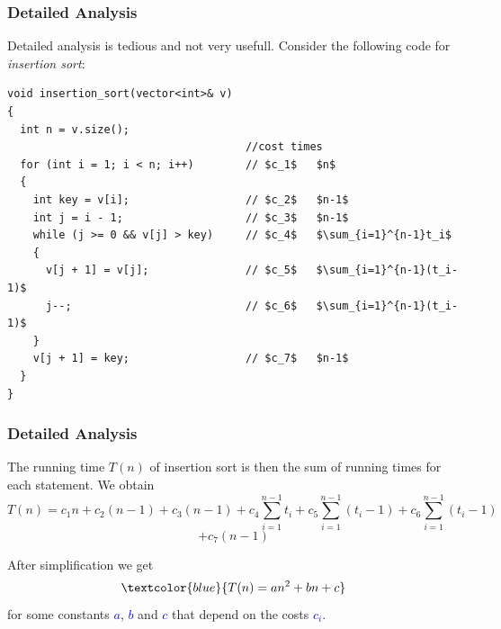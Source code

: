 \documentclass{beamer}
\begin{document}
\begin{frame}[containsverbatim]
\frametitle{Detailed Analysis}

\scriptsize

Detailed analysis is tedious and not very usefull.
Consider the following code for \emph{insertion sort}:

\begin{lstlisting}[mathescape]
void insertion_sort(vector<int>& v)
{
  int n = v.size();
                                     //cost times
  for (int i = 1; i < n; i++)        // $c_1$   $n$
  {
    int key = v[i];                  // $c_2$   $n-1$
    int j = i - 1;                   // $c_3$   $n-1$
    while (j >= 0 && v[j] > key)     // $c_4$   $\sum_{i=1}^{n-1}t_i$
    {
      v[j + 1] = v[j];               // $c_5$   $\sum_{i=1}^{n-1}(t_i-1)$
      j--;                           // $c_6$   $\sum_{i=1}^{n-1}(t_i-1)$
    }
    v[j + 1] = key;                  // $c_7$   $n-1$
  }
}
\end{lstlisting}


\end{frame}

\begin{frame}%
\frametitle{Detailed Analysis}

The running time $T(n)$ of insertion sort is then the sum of running times for
each statement. We obtain
$$
T(n) = c_1n + c_2(n - 1) + c_3(n - 1) + c_4\sum_{i=1}^{n-1}t_i + c_5\sum_{i=1}^{n-1}(t_i - 1) + c_6\sum_{i=1}^{n-1}(t_i - 1)
$$
$$
 + c_7(n - 1)
$$

After simplification we get
$$
\textcolor{blue}{T(n) = an^2 + bn + c}
$$
for some constants \textcolor{blue}{$a$}, \textcolor{blue}{$b$} and \textcolor{blue}{$c$} that depend on the costs \textcolor{blue}{$c_i$}.

\end{frame}

\end{document}
